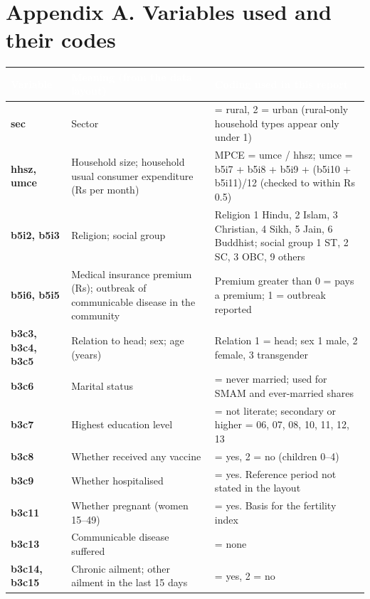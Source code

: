 \documentclass[10pt,a4paper]{article}
\begin{document}
\section*{Appendix A. Variables used and their codes}

\begin{center}
\begin{tabular}{>{\raggedright\arraybackslash}p{2.92cm}>{\raggedright\arraybackslash}p{5.92cm}>{\raggedright\arraybackslash}p{7.32cm}}
\toprule
\rowcolor{navy}\textcolor{white}{\textbf{Variable}} & \textcolor{white}{\textbf{Meaning (from the data layout)}} & \textcolor{white}{\textbf{Coding used in this report}} \\
\midrule
\textbf{sec} & Sector & 1 = rural, 2 = urban (rural-only household types appear only under 1) \\
\textbf{hhsz, umce} & Household size; household usual consumer expenditure (Rs per month) & MPCE = umce / hhsz; umce = b5i7 + b5i8 + b5i9 + (b5i10 + b5i11)/12 (checked to within Rs 0.5) \\
\textbf{b5i2, b5i3} & Religion; social group & Religion 1 Hindu, 2 Islam, 3 Christian, 4 Sikh, 5 Jain, 6 Buddhist; social group 1 ST, 2 SC, 3 OBC, 9 others \\
\textbf{b5i6, b5i5} & Medical insurance premium (Rs); outbreak of communicable disease in the community & Premium greater than 0 = pays a premium; 1 = outbreak reported \\
\textbf{b3c3, b3c4, b3c5} & Relation to head; sex; age (years) & Relation 1 = head; sex 1 male, 2 female, 3 transgender \\
\textbf{b3c6} & Marital status & 1 = never married; used for SMAM and ever-married shares \\
\textbf{b3c7} & Highest education level & 01 = not literate; secondary or higher = 06, 07, 08, 10, 11, 12, 13 \\
\textbf{b3c8} & Whether received any vaccine & 1 = yes, 2 = no (children 0--4) \\
\textbf{b3c9} & Whether hospitalised & 1 = yes. Reference period not stated in the layout \\
\textbf{b3c11} & Whether pregnant (women 15--49) & 1 = yes. Basis for the fertility index \\
\textbf{b3c13} & Communicable disease suffered & 19 = none \\
\textbf{b3c14, b3c15} & Chronic ailment; other ailment in the last 15 days & 1 = yes, 2 = no \\

\end{tabular}
\end{center}
\end{document}
